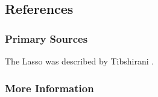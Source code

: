 
\subsection{References}

\subsubsection{Primary Sources}
The Lasso was described by Tibshirani \cite{Tibshirani1996}.

\subsubsection{More Information}



